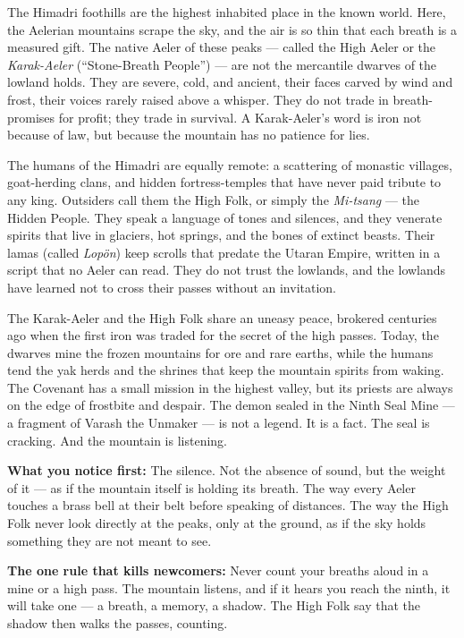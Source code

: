 \vspace{2mm}
\begin{tcolorbox}[colback=black!3,colframe=blue!60!black,title={Theme \& Atmosphere},breakable]
The Himadri foothills are the highest inhabited place in the known world. Here, the Aelerian mountains scrape the sky, and the air is so thin that each breath is a measured gift. The native Aeler of these peaks --- called the High Aeler or the \emph{Karak-Aeler} (``Stone-Breath People'') --- are not the mercantile dwarves of the lowland holds. They are severe, cold, and ancient, their faces carved by wind and frost, their voices rarely raised above a whisper. They do not trade in breath-promises for profit; they trade in survival. A Karak-Aeler's word is iron not because of law, but because the mountain has no patience for lies.

The humans of the Himadri are equally remote: a scattering of monastic villages, goat-herding clans, and hidden fortress-temples that have never paid tribute to any king. Outsiders call them the High Folk, or simply the \emph{Mi-tsang} --- the Hidden People. They speak a language of tones and silences, and they venerate spirits that live in glaciers, hot springs, and the bones of extinct beasts. Their lamas (called \emph{Lopön}) keep scrolls that predate the Utaran Empire, written in a script that no Aeler can read. They do not trust the lowlands, and the lowlands have learned not to cross their passes without an invitation.

The Karak-Aeler and the High Folk share an uneasy peace, brokered centuries ago when the first iron was traded for the secret of the high passes. Today, the dwarves mine the frozen mountains for ore and rare earths, while the humans tend the yak herds and the shrines that keep the mountain spirits from waking. The Covenant has a small mission in the highest valley, but its priests are always on the edge of frostbite and despair. The demon sealed in the Ninth Seal Mine --- a fragment of Varash the Unmaker --- is not a legend. It is a fact. The seal is cracking. And the mountain is listening.

\vspace{2mm}
\textbf{What you notice first:} The silence. Not the absence of sound, but the weight of it --- as if the mountain itself is holding its breath. The way every Aeler touches a brass bell at their belt before speaking of distances. The way the High Folk never look directly at the peaks, only at the ground, as if the sky holds something they are not meant to see.

\textbf{The one rule that kills newcomers:} Never count your breaths aloud in a mine or a high pass. The mountain listens, and if it hears you reach the ninth, it will take one --- a breath, a memory, a shadow. The High Folk say that the shadow then walks the passes, counting.
\end{tcolorbox}

